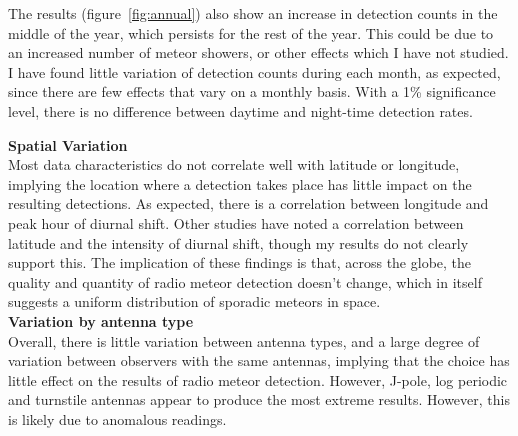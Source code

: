 \documentclass[landscape,a0paper,fontscale=0.400]{baposter} %
\begin{document}
\begin{poster}
{\begin{multicols}{3}
The results (figure~\ref{fig:annual}) also show an increase in detection counts in the middle of the year, which persists for the rest of the year. This could be due to an increased number of meteor showers, or other effects which I have not studied. I have found little variation of detection counts during each month, as expected, since there are few effects that vary on a monthly basis. With a 1\% significance level, there is no difference between daytime and night-time detection rates.

\vfill\null
\columnbreak

{\large \bf Spatial Variation\\}
Most data characteristics do not correlate well with latitude or longitude, implying the location where a detection takes place has little impact on the resulting detections. As expected, there is a correlation between longitude and peak hour of diurnal shift. Other studies \cite{latitudes} have noted a correlation between latitude and the intensity of diurnal shift, though my results do not clearly support this. The implication of these findings is that, across the globe, the quality and quantity of radio meteor detection doesn't change, which in itself suggests a uniform distribution of sporadic meteors in space. \\


{\large \bf Variation by antenna type\\}
Overall, there is little variation between antenna types, and a large degree of variation between observers with the same antennas, implying that the choice has little effect on the results of radio meteor detection. However, J-pole, log periodic and turnstile antennas appear to produce the most extreme results. However, this is likely due to anomalous readings. \\
\end{multicols}
}




\end{poster}
\end{document}
